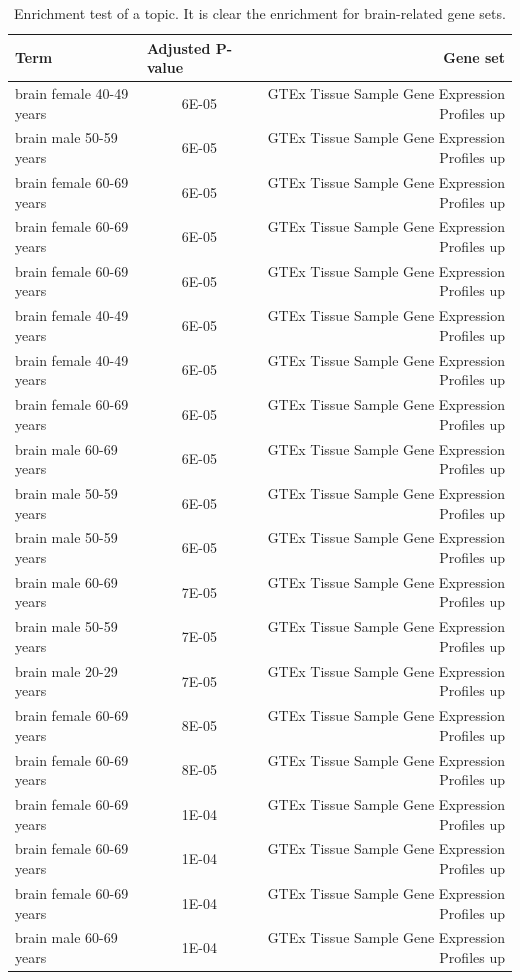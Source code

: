 \begin{table}[htb!]
	\tiny
	\begin{center}
		\begin{tabular}{|l|c|r|}
			\hline
			Term & \multicolumn{1}{l|}{Adjusted P-value} & Gene set \\ \hline
			brain female 40-49 years & 6E-05 & GTEx Tissue Sample Gene Expression Profiles up \\ \hline
			brain male 50-59 years & 6E-05 & GTEx Tissue Sample Gene Expression Profiles up \\ \hline
			brain female 60-69 years & 6E-05 & GTEx Tissue Sample Gene Expression Profiles up \\ \hline
			brain female 60-69 years & 6E-05 & GTEx Tissue Sample Gene Expression Profiles up \\ \hline
			brain female 60-69 years & 6E-05 & GTEx Tissue Sample Gene Expression Profiles up \\ \hline
			brain female 40-49 years & 6E-05 & GTEx Tissue Sample Gene Expression Profiles up \\ \hline
			brain female 40-49 years & 6E-05 & GTEx Tissue Sample Gene Expression Profiles up \\ \hline
			brain female 60-69 years & 6E-05 & GTEx Tissue Sample Gene Expression Profiles up \\ \hline
			brain male 60-69 years & 6E-05 & GTEx Tissue Sample Gene Expression Profiles up \\ \hline
			brain male 50-59 years & 6E-05 & GTEx Tissue Sample Gene Expression Profiles up \\ \hline
			brain male 50-59 years & 6E-05 & GTEx Tissue Sample Gene Expression Profiles up \\ \hline
			brain male 60-69 years & 7E-05 & GTEx Tissue Sample Gene Expression Profiles up \\ \hline
			brain male 50-59 years & 7E-05 & GTEx Tissue Sample Gene Expression Profiles up \\ \hline
			brain male 20-29 years & 7E-05 & GTEx Tissue Sample Gene Expression Profiles up \\ \hline
			brain female 60-69 years & 8E-05 & GTEx Tissue Sample Gene Expression Profiles up \\ \hline
			brain female 60-69 years & 8E-05 & GTEx Tissue Sample Gene Expression Profiles up \\ \hline
			brain female 60-69 years & 1E-04 & GTEx Tissue Sample Gene Expression Profiles up \\ \hline
			brain female 60-69 years & 1E-04 & GTEx Tissue Sample Gene Expression Profiles up \\ \hline
			brain female 60-69 years & 1E-04 & GTEx Tissue Sample Gene Expression Profiles up \\ \hline
			brain male 60-69 years & 1E-04 & GTEx Tissue Sample Gene Expression Profiles up \\ \hline
		\end{tabular}
	\end{center}
	\caption{Enrichment test of a topic. It is clear the enrichment for brain-related gene sets.}
	\label{tab:topic/enrich/brain}
\end{table}
